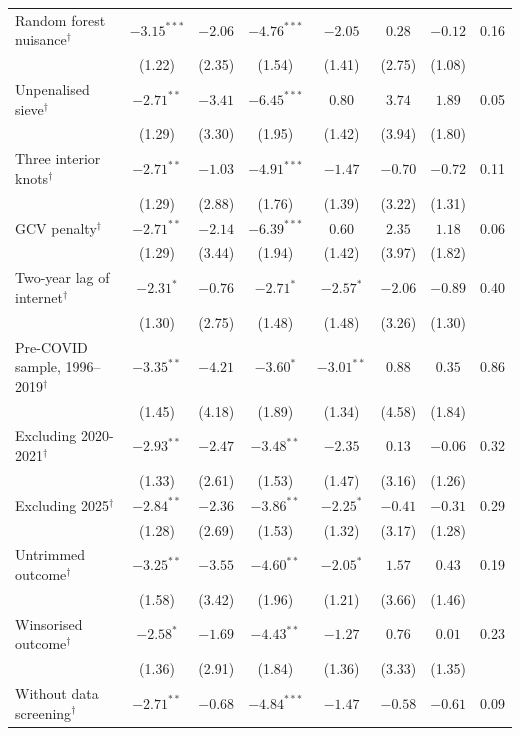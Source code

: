 \documentclass[preprint,12pt,authoryear]{elsarticle}
\begin{document}
\begin{table}[!p]
\begin{threeparttable}
\begin{tabular}{lccccccc}
\quad Random forest nuisance$^{\dagger}$ & $-3.15^{***}$ & $-2.06$ & $-4.76^{***}$ & $-2.05$ & $0.28$ & $-0.12$ & 0.16\\
 & (1.22) & (2.35) & (1.54) & (1.41) & (2.75) & (1.08) & \\
\quad Unpenalised sieve$^{\dagger}$ & $-2.71^{**}$ & $-3.41$ & $-6.45^{***}$ & $0.80$ & $3.74$ & $1.89$ & 0.05\\
 & (1.29) & (3.30) & (1.95) & (1.42) & (3.94) & (1.80) & \\
\quad Three interior knots$^{\dagger}$ & $-2.71^{**}$ & $-1.03$ & $-4.91^{***}$ & $-1.47$ & $-0.70$ & $-0.72$ & 0.11\\
 & (1.29) & (2.88) & (1.76) & (1.39) & (3.22) & (1.31) & \\
\quad GCV penalty$^{\dagger}$ & $-2.71^{**}$ & $-2.14$ & $-6.39^{***}$ & $0.60$ & $2.35$ & $1.18$ & 0.06\\
 & (1.29) & (3.44) & (1.94) & (1.42) & (3.97) & (1.82) & \\
\quad Two-year lag of internet$^{\dagger}$ & $-2.31^{*}$ & $-0.76$ & $-2.71^{*}$ & $-2.57^{*}$ & $-2.06$ & $-0.89$ & 0.40\\
 & (1.30) & (2.75) & (1.48) & (1.48) & (3.26) & (1.30) & \\
\quad Pre-COVID sample, 1996--2019$^{\dagger}$ & $-3.35^{**}$ & $-4.21$ & $-3.60^{*}$ & $-3.01^{**}$ & $0.88$ & $0.35$ & 0.86\\
 & (1.45) & (4.18) & (1.89) & (1.34) & (4.58) & (1.84) & \\
\quad Excluding 2020-2021$^{\dagger}$ & $-2.93^{**}$ & $-2.47$ & $-3.48^{**}$ & $-2.35$ & $0.13$ & $-0.06$ & 0.32\\
 & (1.33) & (2.61) & (1.53) & (1.47) & (3.16) & (1.26) & \\
\quad Excluding 2025$^{\dagger}$ & $-2.84^{**}$ & $-2.36$ & $-3.86^{**}$ & $-2.25^{*}$ & $-0.41$ & $-0.31$ & 0.29\\
 & (1.28) & (2.69) & (1.53) & (1.32) & (3.17) & (1.28) & \\
\quad Untrimmed outcome$^{\dagger}$ & $-3.25^{**}$ & $-3.55$ & $-4.60^{**}$ & $-2.05^{*}$ & $1.57$ & $0.43$ & 0.19\\
 & (1.58) & (3.42) & (1.96) & (1.21) & (3.66) & (1.46) & \\
\quad Winsorised outcome$^{\dagger}$ & $-2.58^{*}$ & $-1.69$ & $-4.43^{**}$ & $-1.27$ & $0.76$ & $0.01$ & 0.23\\
 & (1.36) & (2.91) & (1.84) & (1.36) & (3.33) & (1.35) & \\
\quad Without data screening$^{\dagger}$ & $-2.71^{**}$ & $-0.68$ & $-4.84^{***}$ & $-1.47$ & $-0.58$ & $-0.61$ & 0.09\\

\end{tabular}
\end{threeparttable}
\end{table}
\end{document}
